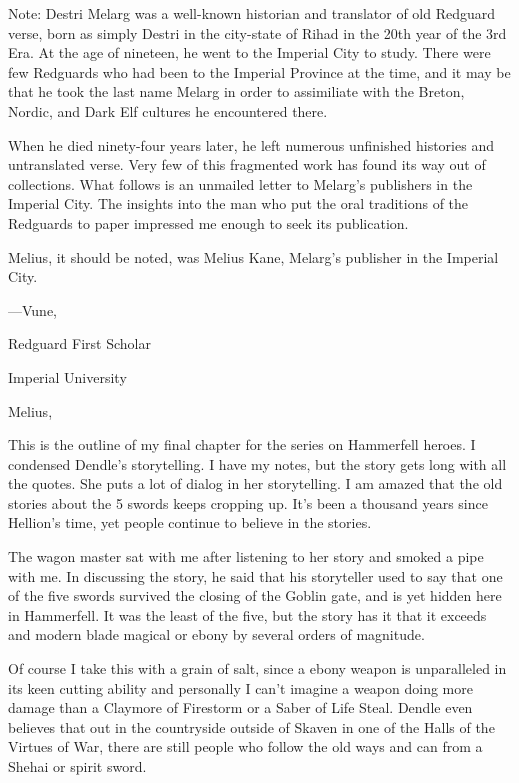 
 Note: Destri Melarg was a well-known historian and translator of old Redguard verse, born as simply Destri in the city-state of Rihad in the 20th year of the 3rd Era. At the age of nineteen, he went to the Imperial City to study. There were few Redguards who had been to the Imperial Province at the time, and it may be that he took the last name Melarg in order to assimiliate with the Breton, Nordic, and Dark Elf cultures he encountered there.

When he died ninety-four years later, he left numerous unfinished histories and untranslated verse. Very few of this fragmented work has found its way out of collections. What follows is an unmailed letter to Melarg's publishers in the Imperial City. The insights into the man who put the oral traditions of the Redguards to paper impressed me enough to seek its publication.

Melius, it should be noted, was Melius Kane, Melarg's publisher in the Imperial City.

\hfill ---Vune,

\hfill Redguard First Scholar

\hfill Imperial University

\sectionline

Melius,

This is the outline of my final chapter for the series on Hammerfell heroes. I condensed Dendle's storytelling. I have my notes, but the story gets long with all the quotes. She puts a lot of dialog in her storytelling. I am amazed that the old stories about the 5 swords keeps cropping up. It's been a thousand years since Hellion's time, yet people continue to believe in the stories.

The wagon master sat with me after listening to her story and smoked a pipe with me. In discussing the story, he said that his storyteller used to say that one of the five swords survived the closing of the Goblin gate, and is yet hidden here in Hammerfell. It was the least of the five, but the story has it that it exceeds and modern blade magical or ebony by several orders of magnitude.

Of course I take this with a grain of salt, since a ebony weapon is unparalleled in its keen cutting ability and personally I can't imagine a weapon doing more damage than a Claymore of Firestorm or a Saber of Life Steal. Dendle even believes that out in the countryside outside of Skaven in one of the Halls of the Virtues of War, there are still people who follow the old ways and can from a Shehai or spirit sword.

